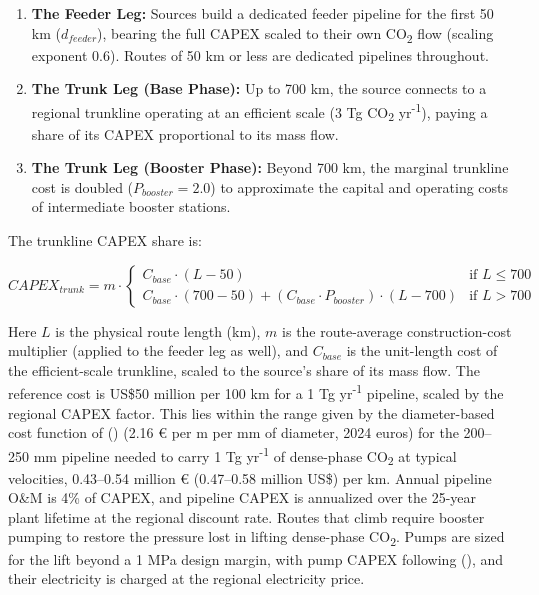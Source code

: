 \documentclass[
  letterpaper,
]{article}
\begin{document}
\begin{enumerate}
\def\labelenumi{\arabic{enumi}.}
\item
  \textbf{The Feeder Leg:} Sources build a dedicated feeder pipeline for
  the first 50 km (\(d_{feeder}\)), bearing the full CAPEX scaled to
  their own CO\textsubscript{2} flow (scaling exponent 0.6). Routes of
  50 km or less are dedicated pipelines throughout.
\item
  \textbf{The Trunk Leg (Base Phase):} Up to 700 km, the source connects
  to a regional trunkline operating at an efficient scale (3 Tg
  CO\textsubscript{2} yr\textsuperscript{-1}), paying a share of its
  CAPEX proportional to its mass flow.
\item
  \textbf{The Trunk Leg (Booster Phase):} Beyond 700 km, the marginal
  trunkline cost is doubled (\(P_{booster} = 2.0\)) to approximate the
  capital and operating costs of intermediate booster stations.
\end{enumerate}

The trunkline CAPEX share is:

\[CAPEX_{trunk} = m \cdot
\begin{cases}
C_{base} \cdot (L - 50) & \text{if } L \le 700 \\
C_{base} \cdot (700 - 50) + (C_{base} \cdot P_{booster}) \cdot (L - 700) & \text{if } L > 700
\end{cases}\]

Here \(L\) is the physical route length (km), \(m\) is the route-average
construction-cost multiplier (applied to the feeder leg as well), and
\(C_{base}\) is the unit-length cost of the efficient-scale trunkline,
scaled to the source's share of its mass flow. The reference cost is
US\$50 million per 100 km for a 1 Tg yr\textsuperscript{-1} pipeline,
scaled by the regional CAPEX factor. This lies within the range given by
the diameter-based cost function of
() (2.16 € per m per mm of
diameter, 2024 euros) for the 200--250 mm pipeline needed to carry 1 Tg
yr\textsuperscript{-1} of dense-phase CO\textsubscript{2} at typical
velocities, 0.43--0.54 million € (0.47--0.58 million US\$) per km.
Annual pipeline O\&M is 4\% of CAPEX, and pipeline CAPEX is annualized
over the 25-year plant lifetime at the regional discount rate. Routes
that climb require booster pumping to restore the pressure lost in
lifting dense-phase CO\textsubscript{2}. Pumps are sized for the lift
beyond a 1 MPa design margin, with pump CAPEX following
(), and their electricity is
charged at the regional electricity price.
\end{document}
